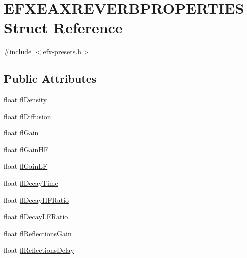 \hypertarget{struct_e_f_x_e_a_x_r_e_v_e_r_b_p_r_o_p_e_r_t_i_e_s}{}\section{E\+F\+X\+E\+A\+X\+R\+E\+V\+E\+R\+B\+P\+R\+O\+P\+E\+R\+T\+I\+ES Struct Reference}
\label{struct_e_f_x_e_a_x_r_e_v_e_r_b_p_r_o_p_e_r_t_i_e_s}


{\ttfamily \#include $<$efx-\/presets.\+h$>$}

\subsection*{Public Attributes}
\begin{DoxyCompactItemize}
\item 
float \hyperlink{struct_e_f_x_e_a_x_r_e_v_e_r_b_p_r_o_p_e_r_t_i_e_s_ab5a3b61cca9851f8821eecf6c36d34e3}{fl\+Density}
\item 
float \hyperlink{struct_e_f_x_e_a_x_r_e_v_e_r_b_p_r_o_p_e_r_t_i_e_s_a29c5efee127b72105f541e45faa7b9c9}{fl\+Diffusion}
\item 
float \hyperlink{struct_e_f_x_e_a_x_r_e_v_e_r_b_p_r_o_p_e_r_t_i_e_s_a33180186f82371646a6474fb399e12ed}{fl\+Gain}
\item 
float \hyperlink{struct_e_f_x_e_a_x_r_e_v_e_r_b_p_r_o_p_e_r_t_i_e_s_a74bfbe2a9a1eb17a424516981bdb97c2}{fl\+Gain\+HF}
\item 
float \hyperlink{struct_e_f_x_e_a_x_r_e_v_e_r_b_p_r_o_p_e_r_t_i_e_s_a4f1d65608063341a491f257f7ae9168f}{fl\+Gain\+LF}
\item 
float \hyperlink{struct_e_f_x_e_a_x_r_e_v_e_r_b_p_r_o_p_e_r_t_i_e_s_a3b46ec0674d758f0cafc704f31188991}{fl\+Decay\+Time}
\item 
float \hyperlink{struct_e_f_x_e_a_x_r_e_v_e_r_b_p_r_o_p_e_r_t_i_e_s_a2d5a884d6b4e526e72a398796f9ca7f2}{fl\+Decay\+H\+F\+Ratio}
\item 
float \hyperlink{struct_e_f_x_e_a_x_r_e_v_e_r_b_p_r_o_p_e_r_t_i_e_s_a5dc249af8c345b5a0b64fc932af2956c}{fl\+Decay\+L\+F\+Ratio}
\item 
float \hyperlink{struct_e_f_x_e_a_x_r_e_v_e_r_b_p_r_o_p_e_r_t_i_e_s_a317cf554c3b9089073abf901b692cc9e}{fl\+Reflections\+Gain}
\item 
float \hyperlink{struct_e_f_x_e_a_x_r_e_v_e_r_b_p_r_o_p_e_r_t_i_e_s_a6ead5cd0e89a41eb425cf519b05d4fb2}{fl\+Reflections\+Delay}
\item 

\end{DoxyCompactItemize}
